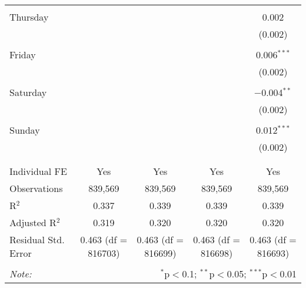 \documentclass[
]{article}
\begin{document}
\begin{table}[!htbp]
{\begin{tabular}{@{\extracolsep{5pt}}lcccc}
  & & & & \\ 
 Thursday &  &  &  & 0.002 \\ 
  &  &  &  & (0.002) \\ 
  & & & & \\ 
 Friday &  &  &  & 0.006$^{***}$ \\ 
  &  &  &  & (0.002) \\ 
  & & & & \\ 
 Saturday &  &  &  & $-$0.004$^{**}$ \\ 
  &  &  &  & (0.002) \\ 
  & & & & \\ 
 Sunday &  &  &  & 0.012$^{***}$ \\ 
  &  &  &  & (0.002) \\ 
  & & & & \\ 
\hline \\[-1.8ex] 
Individual FE & Yes & Yes & Yes & Yes \\ 
Observations & 839,569 & 839,569 & 839,569 & 839,569 \\ 
R$^{2}$ & 0.337 & 0.339 & 0.339 & 0.339 \\ 
Adjusted R$^{2}$ & 0.319 & 0.320 & 0.320 & 0.320 \\ 
Residual Std. Error & 0.463 (df = 816703) & 0.463 (df = 816699) & 0.463 (df = 816698) & 0.463 (df = 816693) \\ 
\hline 
\hline \\[-1.8ex] 
\textit{Note:}  & \multicolumn{4}{r}{$^{*}$p$<$0.1; $^{**}$p$<$0.05; $^{***}$p$<$0.01} \\ 
\end{tabular}
} 
\end{table} 
\newpage
\end{document}
